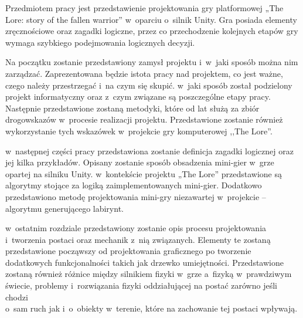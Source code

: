 \documentclass[oneside,polski,logo]{amuthesis}
\author{Kamil Tyrek, Mateusz Hypś, Jakub Kozubal}
\date{Poznań, luty 2021}
\begin{document}
\maketitle

\author{Kamil Tyrek}
\makestatement

\author{Mateusz Hypś}
\makestatement

\author{Jakub Kozubal}
\makestatement

\begin{streszczenie}
Przedmiotem pracy jest przedstawienie projektowania gry platformowej „The Lore: story of the fallen warrior” w~oparciu o~silnik Unity. Gra posiada elementy zręcznościowe oraz zagadki logiczne, przez co przechodzenie kolejnych etapów gry wymaga szybkiego podejmowania logicznych decyzji. \par
Na początku zostanie przedstawiony zamysł projektu i~w~jaki sposób można nim zarządzać. Zaprezentowana będzie istota pracy nad projektem, co jest ważne, czego należy przestrzegać i~na czym się skupić. w~jaki sposób został podzielony projekt informatyczny oraz z~czym związane są poszczególne etapy pracy. Następnie przedstawione zostaną metodyki, które od lat służą za zbiór drogowskazów w~procesie realizacji projektu. Przedstawione zostanie również wykorzystanie tych wskazówek w~projekcie gry komputerowej ,,The Lore''. \par
w~następnej części pracy przedstawiona zostanie definicja zagadki logicznej oraz jej kilka przykładów. Opisany zostanie sposób obsadzenia mini-gier w~grze opartej na silniku Unity. w~kontekście projektu „The Lore” przedstawione są algorytmy stojące za logiką zaimplementowanych mini-gier. Dodatkowo przedstawiono metodę projektowania mini-gry niezawartej w~projekcie – algorytmu generującego labirynt. \par
w~ostatnim rozdziale przedstawiony zostanie opis procesu projektowania\\ i~tworzenia postaci oraz mechanik z~nią związanych. Elementy te zostaną przedstawione począwszy od projektowania graficznego po tworzenie dodatkowych funkcjonalności takich jak drzewko umiejętności. Przedstawione zostaną również różnice między silnikiem fizyki w~grze a~fizyką w~prawdziwym świecie, problemy i~rozwiązania fizyki oddziałującej na postać zarówno jeśli chodzi\\ o~sam ruch jak i~o~obiekty w~terenie, które na zachowanie tej postaci wpływają.
\end{streszczenie}
\end{document}
